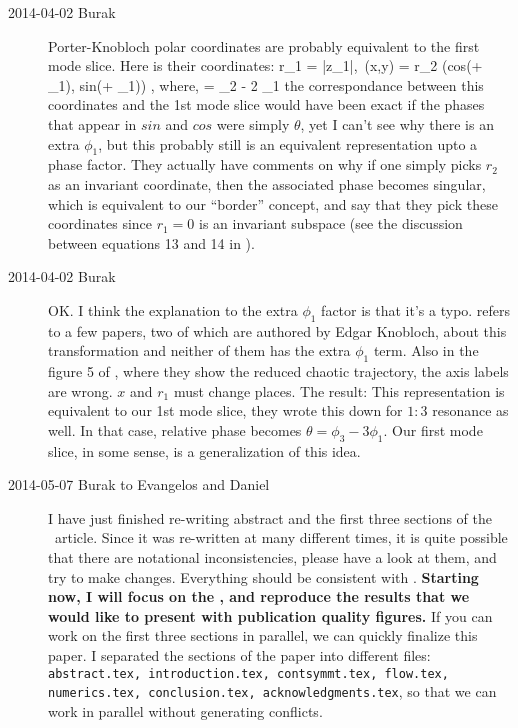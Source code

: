 \begin{description}
\item[2014-04-02 Burak] Porter-Knobloch polar coordinates are probably
equivalent to the first mode slice. Here is their coordinates:
\beq
	r_1 = |z_1|,\, (x,y) = r_2 (cos(\theta + \phi_1), sin(\theta + \phi_1))
	, \mbox{where}, \theta = \phi_2 - 2 \phi_1
\eeq
the correspondance between this coordinates and the 1st mode slice would
have been exact if the phases that appear in $sin$ and $cos$ were simply
$\theta$, yet I can't see why there is an extra $\phi_1$, but this probably
still is an equivalent representation upto a phase factor. They actually
have comments on why if one simply picks $r_2$ as an invariant coordinate,
then the associated phase becomes singular, which is equivalent to our
``border'' concept, and say that they pick these coordinates since $r_1=0$
is an invariant subspace (see the discussion between equations 13 and 14 in
).

\item[2014-04-02 Burak] OK. I think the explanation to the extra $\phi_1$
factor is that it's a typo.  refers to a few papers, two
of which are authored by Edgar Knobloch, about this transformation and neither
of them  has the extra $\phi_1$ term. Also in the figure 5 of ,
where they show the reduced chaotic trajectory, the axis labels are wrong.
$x$ and $r_1$ must change places. The result: This representation is equivalent
to our 1st mode slice, they wrote this down for $1:3$ resonance as well.
In that case, relative phase becomes $\theta = \phi_3 - 3 \phi_1$. Our first
mode slice, in some sense, is a generalization of this idea.

\item[2014-05-07 Burak to Evangelos and Daniel] I have just finished re-writing
abstract and the first three sections of the \twoMode\ article. Since it
was re-written at many different times, it is quite possible that there are
notational inconsistencies, please have a look at them, and try to make
changes. Everything should be consistent with .
{\bf Starting now, I will focus on the , and reproduce
the results that we would like to present with publication quality figures. }
If you can work on the first three sections in parallel, we can quickly
finalize this paper. I separated the sections of the paper into different
files: \texttt{abstract.tex, introduction.tex, contsymmt.tex, flow.tex,
numerics.tex, conclusion.tex, acknowledgments.tex}, so that we
can work in parallel without generating conflicts.


\end{description}
